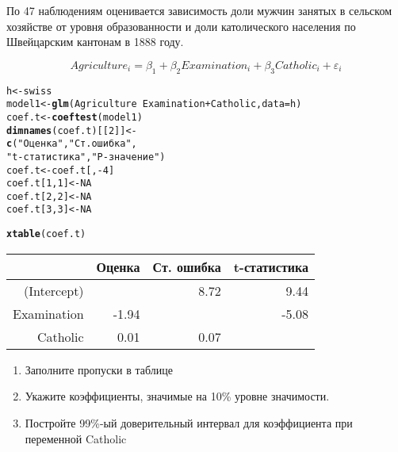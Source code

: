 \documentclass[pdftex,11pt,openany]{book}\usepackage[]{graphicx}\usepackage[]{color}
\makeatletter
\newcommand{\hlnum}[1]{\textcolor[rgb]{0.686,0.059,0.569}{#1}}%
\newcommand{\hlstr}[1]{\textcolor[rgb]{0.192,0.494,0.8}{#1}}%
\newcommand{\hlopt}[1]{\textcolor[rgb]{0,0,0}{#1}}%
\newcommand{\hlstd}[1]{\textcolor[rgb]{0.345,0.345,0.345}{#1}}%
\newcommand{\hlkwb}[1]{\textcolor[rgb]{0.69,0.353,0.396}{#1}}%
\newcommand{\hlkwc}[1]{\textcolor[rgb]{0.333,0.667,0.333}{#1}}%
\newcommand{\hlkwd}[1]{\textcolor[rgb]{0.737,0.353,0.396}{\textbf{#1}}}%
\newenvironment{kframe}{%
 \def\at@end@of@kframe{}%
 \ifinner\ifhmode%
  \def\at@end@of@kframe{\end{minipage}}%
  \begin{minipage}{\columnwidth}%
 \fi\fi%
 \def\FrameCommand##1{\hskip\@totalleftmargin \hskip-\fboxsep
 \colorbox{shadecolor}{##1}\hskip-\fboxsep
     \hskip-\linewidth \hskip-\@totalleftmargin \hskip\columnwidth}%
 \MakeFramed {\advance\hsize-\width
   \@totalleftmargin\z@ \linewidth\hsize
   \@setminipage}}%
 {\par\unskip\endMakeFramed%
 \at@end@of@kframe}
\newenvironment{knitrout}{}{} %
\makeatother
\begin{document}
\begin{problem}
 По 47 наблюдениям оценивается зависимость доли мужчин занятых в сельском хозяйстве от уровня образованности и доли католического населения по Швейцарским кантонам в 1888 году.

\[Agriculture_i=\beta_1+\beta_2 Examination_i+\beta_3 Catholic_i+\varepsilon_i\]

\begin{knitrout}
\color{fgcolor}\begin{kframe}
\begin{alltt}
\hlstd{h} \hlkwb{<-} \hlstd{swiss}
\hlstd{model1} \hlkwb{<-} \hlkwd{glm}\hlstd{(Agriculture}\hlopt{~}\hlstd{Examination}\hlopt{+}\hlstd{Catholic,}\hlkwc{data}\hlstd{=h)}
\hlstd{coef.t} \hlkwb{<-} \hlkwd{coeftest}\hlstd{(model1)}
\hlkwd{dimnames}\hlstd{(coef.t)[[}\hlnum{2}\hlstd{]]} \hlkwb{<-}
    \hlkwd{c}\hlstd{(}\hlstr{"Оценка"}\hlstd{,}\hlstr{"Ст. ошибка"}\hlstd{,}
    \hlstr{"t-статистика"}\hlstd{,} \hlstr{"P-значение"}\hlstd{)}
\hlstd{coef.t} \hlkwb{<-} \hlstd{coef.t[,}\hlopt{-}\hlnum{4}\hlstd{]}
\hlstd{coef.t[}\hlnum{1}\hlstd{,}\hlnum{1}\hlstd{]} \hlkwb{<-} \hlnum{NA}
\hlstd{coef.t[}\hlnum{2}\hlstd{,}\hlnum{2}\hlstd{]} \hlkwb{<-} \hlnum{NA}
\hlstd{coef.t[}\hlnum{3}\hlstd{,}\hlnum{3}\hlstd{]} \hlkwb{<-} \hlnum{NA}
\end{alltt}
\end{kframe}
\end{knitrout}



\begin{kframe}
\begin{alltt}
\hlkwd{xtable}\hlstd{(coef.t)}
\end{alltt}
\end{kframe}%
\begin{table}[ht]
\centering
\begin{tabular}{rrrr}
  \hline
 & Оценка & Ст. ошибка & t-статистика \\ 
  \hline
(Intercept) &  & 8.72 & 9.44 \\ 
  Examination & -1.94 &  & -5.08 \\ 
  Catholic & 0.01 & 0.07 &  \\ 
   \hline
\end{tabular}
\end{table}


\begin{enumerate}
\item Заполните пропуски в таблице
\item Укажите коэффициенты, значимые на 10\% уровне значимости.
\item Постройте 99\%-ый доверительный интервал для коэффициента при переменной Catholic 
\end{enumerate}


\end{problem}
\end{document}
